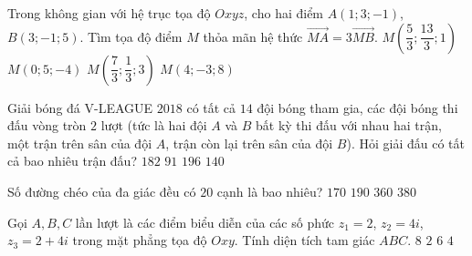 \begin{ex}%
Trong không gian với hệ trục tọa độ $Oxyz$, cho hai điểm $A(1;3;-1)$, $B(3;-1;5)$. Tìm tọa độ điểm $M$ thỏa mãn hệ thức $\vec{MA} = 3\vec{MB}$.
\choice
{$M \left( \dfrac{5}{3}; \dfrac{13}{3}; 1 \right)$}
{$M \left( 0; 5; -4 \right)$}
{$M \left( \dfrac{7}{3}; \dfrac{1}{3}; 3 \right)$}
{\True $M \left( 4; -3; 8 \right)$}
\end{ex}

\begin{ex}%
Giải bóng đá V-LEAGUE $2018$ có tất cả $14$ đội bóng tham gia, các đội bóng thi đấu vòng tròn $2$ lượt (tức là hai đội $A$ và $B$ bất kỳ thi đấu với nhau hai trận, một trận trên sân của đội $A$, trận còn lại trên sân của đội $B$). Hỏi giải đấu có tất cả bao nhiêu trận đấu?
\choice
{\True $182$}
{$91$}
{$196$}
{$140$}
\end{ex}

\begin{ex}%
Số đường chéo của đa giác đều có $20$ cạnh là bao nhiêu?
\choice
{\True $170$}
{$190$}
{$360$}
{$380$}
\end{ex}

\begin{ex}%
Gọi $A,B,C$ lần lượt là các điểm biểu diễn của các số phức $z_1=2$, $z_2 = 4i$, $z_3 = 2 + 4i$ trong mặt phẳng tọa độ $Oxy$. Tính diện tích tam giác $ABC$.
\choice
{$8$}
{$2$}
{$6$}
{\True $4$}
\end{ex}

